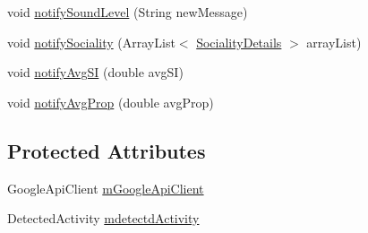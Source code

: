 \begin{DoxyCompactItemize}
\item 
void \hyperlink{classcs_1_1usense_1_1_usense_service_a0eebaecc44d6dc8363b1867f01f47a02}{notify\+Sound\+Level} (String new\+Message)
\item 
void \hyperlink{classcs_1_1usense_1_1_usense_service_ac68f6c9dec8ba7bc40eb3559ffa5fe3a}{notify\+Sociality} (Array\+List$<$ \hyperlink{classcs_1_1usense_1_1inference_module_1_1_sociality_details}{Sociality\+Details} $>$ array\+List)
\item 
void \hyperlink{classcs_1_1usense_1_1_usense_service_a505a4dd908fdf01cb3757d723317d2c6}{notify\+Avg\+S\+I} (double avg\+S\+I)
\item 
void \hyperlink{classcs_1_1usense_1_1_usense_service_a703c4fcc3a80c711a614917b57114753}{notify\+Avg\+Prop} (double avg\+Prop)
\end{DoxyCompactItemize}
\subsection*{Protected Attributes}
\begin{DoxyCompactItemize}
\item 
Google\+Api\+Client \hyperlink{classcs_1_1usense_1_1_usense_service_affdbe849b516c9fac9164abfecce9a13}{m\+Google\+Api\+Client}
\item 
Detected\+Activity \hyperlink{classcs_1_1usense_1_1_usense_service_ad4dd4b6f3a051c8a74ad961b9d49b1a7}{mdetectd\+Activity}
\end{DoxyCompactItemize}
